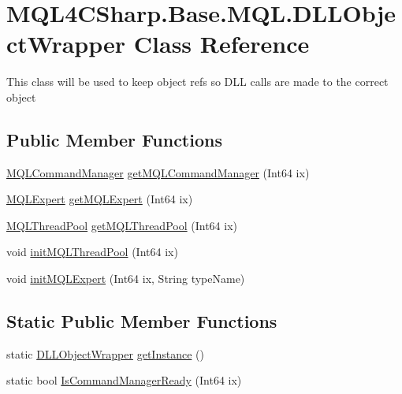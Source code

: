 \hypertarget{class_m_q_l4_c_sharp_1_1_base_1_1_m_q_l_1_1_d_l_l_object_wrapper}{}\section{M\+Q\+L4\+C\+Sharp.\+Base.\+M\+Q\+L.\+D\+L\+L\+Object\+Wrapper Class Reference}
\label{class_m_q_l4_c_sharp_1_1_base_1_1_m_q_l_1_1_d_l_l_object_wrapper}


This class will be used to keep object refs so D\+LL calls are made to the correct object  


\subsection*{Public Member Functions}
\begin{DoxyCompactItemize}
\item 
\hyperlink{class_m_q_l4_c_sharp_1_1_base_1_1_m_q_l_1_1_m_q_l_command_manager}{M\+Q\+L\+Command\+Manager} \hyperlink{class_m_q_l4_c_sharp_1_1_base_1_1_m_q_l_1_1_d_l_l_object_wrapper_a538afe9b0932b011738dbb877e865509}{get\+M\+Q\+L\+Command\+Manager} (Int64 ix)
\item 
\hyperlink{class_m_q_l4_c_sharp_1_1_base_1_1_m_q_l_1_1_m_q_l_expert}{M\+Q\+L\+Expert} \hyperlink{class_m_q_l4_c_sharp_1_1_base_1_1_m_q_l_1_1_d_l_l_object_wrapper_af5b23c966d5df06ba80eb05568e417ab}{get\+M\+Q\+L\+Expert} (Int64 ix)
\item 
\hyperlink{class_m_q_l4_c_sharp_1_1_base_1_1_m_q_l_1_1_m_q_l_thread_pool}{M\+Q\+L\+Thread\+Pool} \hyperlink{class_m_q_l4_c_sharp_1_1_base_1_1_m_q_l_1_1_d_l_l_object_wrapper_a9a57f0a3a3260c7404a2adb319f88e42}{get\+M\+Q\+L\+Thread\+Pool} (Int64 ix)
\item 
void \hyperlink{class_m_q_l4_c_sharp_1_1_base_1_1_m_q_l_1_1_d_l_l_object_wrapper_a01dac4f26cd49a21d4ae4bebca4b4c42}{init\+M\+Q\+L\+Thread\+Pool} (Int64 ix)
\item 
void \hyperlink{class_m_q_l4_c_sharp_1_1_base_1_1_m_q_l_1_1_d_l_l_object_wrapper_a69128c0f6302ecfcbe71f4ea46522eed}{init\+M\+Q\+L\+Expert} (Int64 ix, String type\+Name)
\end{DoxyCompactItemize}
\subsection*{Static Public Member Functions}
\begin{DoxyCompactItemize}
\item 
static \hyperlink{class_m_q_l4_c_sharp_1_1_base_1_1_m_q_l_1_1_d_l_l_object_wrapper}{D\+L\+L\+Object\+Wrapper} \hyperlink{class_m_q_l4_c_sharp_1_1_base_1_1_m_q_l_1_1_d_l_l_object_wrapper_a61923e587f2706a38b3307f8f64bbb11}{get\+Instance} ()
\item 
static bool \hyperlink{class_m_q_l4_c_sharp_1_1_base_1_1_m_q_l_1_1_d_l_l_object_wrapper_ac240e584374ed142c442a0197c44c90b}{Is\+Command\+Manager\+Ready} (Int64 ix)
\end{DoxyCompactItemize}

